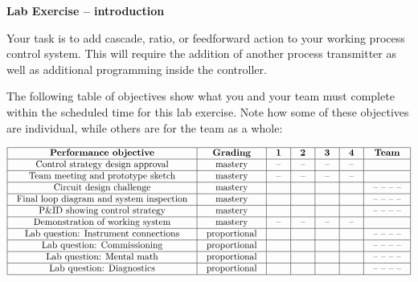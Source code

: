 

\noindent
{\bf Lab Exercise -- introduction}

\vskip 5pt

Your task is to add cascade, ratio, or feedforward action to your working process control system.  This will require the addition of another process transmitter as well as additional programming inside the controller.

The following table of objectives show what you and your team must complete within the scheduled time for this lab exercise.  Note how some of these objectives are individual, while others are for the team as a whole:



$$\vbox{\offinterlineskip
\halign{\strut
\vrule \quad\hfil # \ \hfil & 
\vrule \quad\hfil # \ \hfil & 
\vrule \quad\hfil # \ \hfil & 
\vrule \quad\hfil # \ \hfil & 
\vrule \quad\hfil # \ \hfil & 
\vrule \quad\hfil # \ \hfil & 
\vrule \quad\hfil # \ \hfil \vrule \cr
\noalign{\hrule}
%
{\bf Performance objective} & {\bf Grading} & {\bf 1} & {\bf 2} & {\bf 3} & {\bf 4} & {\bf Team} \cr
%
\noalign{\hrule}
%
Control strategy design approval & mastery & -- & -- & -- & -- & \cr
%
\noalign{\hrule}
%
Team meeting and prototype sketch & mastery & -- & -- & -- & -- & \cr
%
\noalign{\hrule}
%
Circuit design challenge & mastery & & & & & -- -- -- -- \cr
%
\noalign{\hrule}
%
Final loop diagram and system inspection & mastery & & & & & -- -- -- -- \cr
%
\noalign{\hrule}
%
P\&ID showing control strategy & mastery & & & & & -- -- -- -- \cr
%
\noalign{\hrule}
%
Demonstration of working system & mastery & -- & -- & -- & -- & \cr
%
\noalign{\hrule}
%
Lab question: Instrument connections & proportional &  &  &  &  & -- -- -- -- \cr
%
\noalign{\hrule}
%
Lab question: Commissioning & proportional &  &  &  &  & -- -- -- -- \cr
%
\noalign{\hrule}
%
Lab question: Mental math & proportional &  &  &  &  & -- -- -- -- \cr
%
\noalign{\hrule}
%
Lab question: Diagnostics & proportional &  &  &  &  & -- -- -- -- \cr
%
\noalign{\hrule}
} %
}$$ %

